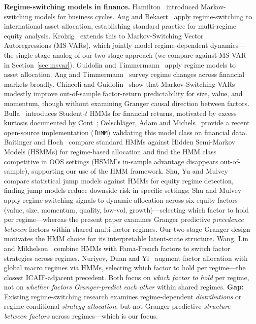 \documentclass[sigconf,anonymous]{acmart}
\begin{document}
\textbf{Regime-switching models in finance.}
Hamilton~\cite{hamilton1989new} introduced Markov-switching models for business cycles.
Ang and Bekaert~\cite{ang2002regime} apply regime-switching to international
asset allocation, establishing standard practice for multi-regime equity analysis.
Krolzig~\cite{krolzig1997markov} extends this to Markov-Switching Vector
Autoregressions (MS-VARs), which jointly model regime-dependent dynamics---the
single-stage analog of our two-stage approach (we compare against MS-VAR
in Section~\ref{sec:msvar}).
Guidolin and Timmermann~\cite{guidolin2007asset} apply regime models to asset allocation.
Ang and Timmermann~\cite{ang2012regime} survey regime changes across financial markets broadly.
Chincoli and Guidolin~\cite{chincoli2017linear} show that Markov-Switching VARs modestly
improve out-of-sample factor-return predictability for size, value, and momentum,
though without examining Granger causal direction between factors.
Bulla~\cite{bulla2011hidden} introduces Student-$t$ HMMs for financial returns,
motivated by excess kurtosis documented by Cont~\cite{cont2001empirical};
Oelschl{\"a}ger, Adam and Michels~\cite{oelschlager2024fhmm} provide a recent
open-source implementation (\texttt{fHMM}) validating this model class on financial data.
Baitinger and Hoch~\cite{baitinger2024simplicity} compare standard HMMs against
Hidden Semi-Markov Models (HSMMs) for regime-based allocation and find the HMM class
competitive in OOS settings (HSMM's in-sample advantage disappears out-of-sample),
supporting our use of the HMM framework.
Shu, Yu and Mulvey~\cite{shu2024downside} compare statistical jump models against HMMs
for equity regime detection, finding jump models reduce downside risk in specific settings;
Shu and Mulvey~\cite{shu2025dynamic} apply regime-switching signals to dynamic allocation
across six equity factors (value, size, momentum, quality, low-vol, growth)---selecting which factor
to hold per regime---whereas the present paper examines Granger predictive \emph{precedence between}
factors within shared multi-factor regimes.
Our two-stage Granger design motivates the HMM choice for its interpretable latent-state structure.
Wang, Lin and Mikhelson~\cite{wang2020regime} combine HMMs with Fama-French factors
to switch factor strategies across regimes.
Nuriyev, Duan and Yi~\cite{nuriyev2024regime} augment factor allocation with global macro regimes via HMMs, selecting which factor to hold per regime---the closest ICAIF-adjacent precedent.
Both focus on \emph{which factor to hold} per regime, not on \emph{whether factors Granger-predict each other} within shared regimes.
\textbf{Gap:} Existing regime-switching research examines regime-dependent
\emph{distributions} or regime-conditional \emph{strategy allocation}, but not
Granger predictive \emph{structure between factors} across regimes---which is our focus.
\end{document}
